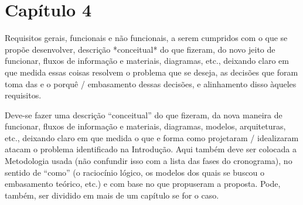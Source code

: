 \chapter{Capítulo 4}

Requisitos gerais,  funcionais  e  não  funcionais, a  serem  cumpridos com  o  que  se  propõe desenvolver,  descrição  *conceitual*  do  que fizeram,    do  novo  jeito  de  funcionar,  fluxos  de informação e materiais, diagramas, etc., deixando claro em que medida essas coisas resolvem o problema  que  se  deseja,  as  decisões  que  foram  toma das  e  o  porquê  /  embasamento  dessas decisões, e alinhamento disso àqueles requisitos.

Deve-se fazer uma descrição “conceitual” do que fizeram, da nova maneira de funcionar, fluxos de informação e materiais, diagramas, modelos, arquiteturas, etc., deixando claro em que medida o que e forma como projetaram / idealizaram atacam o problema identificado na Introdução. 
Aqui também deve ser colocada a Metodologia usada (não confundir isso com a lista das fases do cronograma), no sentido de “como” (o raciocínio lógico, os modelos dos quais se buscou o embasamento teórico, etc.) e com base no que propuseram a proposta.
Pode, também, ser dividido em mais de um capítulo se for o caso.
